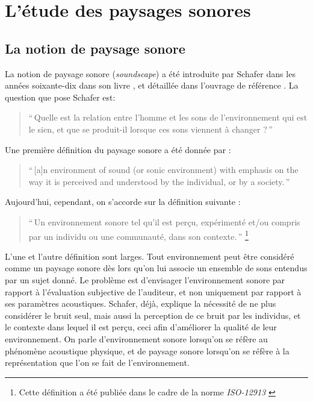 
\section{L'étude des paysages sonores}
\label{sec:paysageSonore}

\subsection{La notion de paysage sonore}

La notion de paysage sonore (\emph{soundscape}) a été introduite par Schafer dans les années soixante-dix dans son livre \citep{schafer1969new}, et détaillée dans l'ouvrage de référence \citep{schafer1977tuning}. La question que pose Schafer est:

\begin{quote}
``\,Quelle est la relation entre l'homme et les sons de l'environnement qui est le sien, et que se produit-il lorsque ces sons viennent à changer ?\,''
\end{quote}

Une première définition du paysage sonore a été donnée par \citep{truax1978handbook}:

\begin{quote}
``\,[a]n environment of sound (or sonic environment) with emphasis on the way it is perceived and understood by the individual, or by a society.\,'' 
\end{quote}

Aujourd'hui, cependant, on s'accorde sur la définition suivante \citep{aletta2016soundscape}:

\begin{quote}
``\,Un environnement sonore tel qu'il est perçu, expérimenté et/ou compris par un individu ou une communauté, dans son contexte.\,'' \footnote{Cette définition a été publiée dans le cadre de la norme \emph{ISO-12913} \citep{iso12913}}
\end{quote}

L'une et l'autre définition sont larges. Tout environnement peut être considéré comme un paysage sonore dès lors qu'on lui associe un ensemble de sons entendus par un sujet donné. Le problème est d'envisager l’environnement sonore par rapport à l'évaluation subjective de l'auditeur, et non uniquement par rapport à ses paramètres acoustiques. Schafer, déjà, explique la nécessité de ne plus considérer le bruit seul, mais aussi la perception de ce bruit par les individus, et le contexte dans lequel il est perçu, ceci afin d'améliorer la qualité de leur environnement. On parle d'environnement sonore lorsqu'on se réfère au phénomène acoustique physique, et de paysage sonore  lorsqu'on se réfère à la représentation que l'on se fait de l'environnement.

